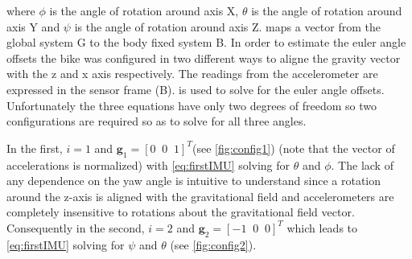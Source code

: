 where \ensuremath{\phi} is the angle of rotation around axis X, \ensuremath{\theta} is the angle of rotation around axis Y and \ensuremath{\psi} is the angle of rotation around axis Z.  maps a vector from the global system G to the body fixed system B. In order to estimate the euler angle offsets the bike was configured in two different ways to aligne the gravity vector with the z and x axis respectively.
The readings from the accelerometer are expressed in the sensor frame (B).   is used to solve for the euler angle offsets. Unfortunately the three equations have only two degrees of freedom so two configurations are required so as to solve for all three angles. 

 In the first, \ensuremath{i=1} and \ensuremath{\boldsymbol{g}_1=[ 0 \;\; 0 \;\; 1]^T }(see \cref{fig:config1}) (note that the vector of accelerations is normalized)  with \cref{eq:firstIMU} solving for \ensuremath{\theta} and \ensuremath{\phi}. The lack of any dependence on the yaw  angle is intuitive to understand since a rotation  around the z-axis is aligned with the gravitational field and accelerometers are completely insensitive to rotations about the gravitational field vector. Consequently in the second, \ensuremath{i=2} and \ensuremath{\boldsymbol{g}_2=[ -1 \;\;0\;\; 0 ]^T} which leads to   \cref{eq:firstIMU} solving for \ensuremath{\psi} and \ensuremath{\theta} (see \cref{fig:config2}).
 
